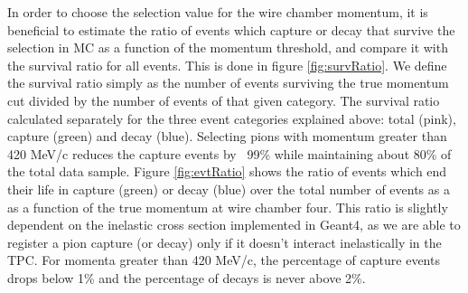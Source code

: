 In order to choose the selection value for the wire chamber momentum, it is beneficial to estimate the ratio of events which capture or decay that survive the selection in MC as a function of the momentum threshold, and compare it with the survival ratio for all events. This is done in figure \ref{fig:survRatio}. We define the survival ratio simply  as the number of events surviving the true momentum cut divided by the number of events of that given category. The survival ratio calculated separately for the three event categories explained above: total (pink), capture (green) and decay (blue).
Selecting pions with momentum greater than 420 MeV/c reduces the capture events by ~99\% while maintaining about 80\% of the total data sample. 
Figure \ref{fig:evtRatio} shows the ratio of events which end their life in capture (green) or decay (blue) over the total number of events as a as a function of the true momentum at wire chamber four. This ratio is slightly dependent on the inelastic cross section implemented in Geant4, as we are able to register a pion capture (or decay) only if it doesn't interact inelastically in the TPC. For momenta greater than 420 MeV/c, the percentage of capture events drops below 1\% and the percentage of decays is never above 2\%.

